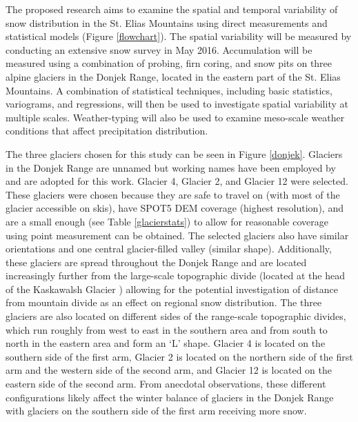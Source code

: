 \documentclass[12pt]{article}
\begin{document}
The proposed research aims to examine the spatial and temporal variability of snow distribution in the St. Elias Mountains using direct measurements and statistical models (Figure \ref{flowchart}). The spatial variability will be measured by conducting an extensive snow survey in May 2016. Accumulation will be measured using a combination of probing, firn coring, and snow pits on three alpine glaciers in the Donjek Range, located in the eastern part of the St. Elias Mountains. A combination of statistical techniques, including basic statistics, variograms, and regressions, will then be used to investigate spatial variability at multiple scales. Weather-typing will also be used to examine meso-scale weather conditions that affect precipitation distribution. 

The three glaciers chosen for this study can be seen in Figure \ref{donjek}. Glaciers in the Donjek Range are unnamed but working names have been employed by \cite{Crompton2016} and are adopted for this work. Glacier 4, Glacier 2, and Glacier 12 were selected. These glaciers were chosen because they are safe to travel on (with most of the glacier accessible on skis), have SPOT5 DEM coverage (highest resolution), and are a small enough (see Table \ref{glacierstats}) to allow for reasonable coverage using point measurement can be obtained. The selected glaciers also have similar orientations and one central glacier-filled valley (similar shape). Additionally, these glaciers are spread throughout the Donjek Range and are located increasingly further from the large-scale topographic divide (located at the head of the Kaskawalsh Glacier \citep{Taylor1969}) allowing for the potential investigation of distance from mountain divide as an effect on regional snow distribution. The three glaciers are also located on different sides of the range-scale topographic divides, which run roughly from west to east in the southern area and from south to north in the eastern area and form an `L' shape. Glacier 4 is located on the southern side of the first arm, Glacier 2 is located on the northern side of the first arm and the western side of the second arm, and Glacier 12 is located on the eastern side of the second arm. From anecdotal observations, these different configurations likely affect the winter balance of glaciers in the Donjek Range with glaciers on the southern side of the first arm receiving more snow.
\end{document}
